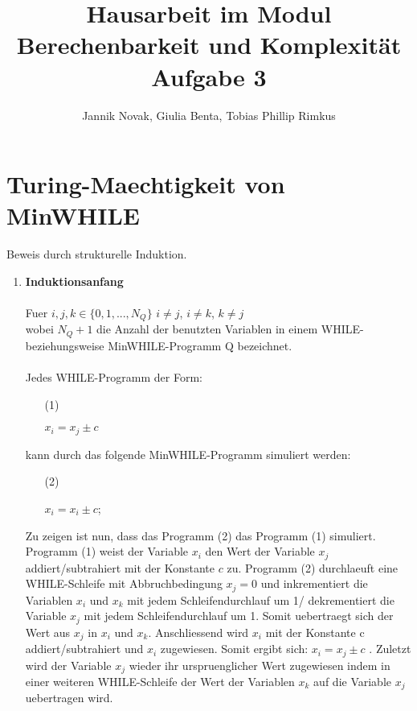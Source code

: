 \documentclass[a4paper,onecolumn,oneside,12pt,ngerman]{article}
\title{Hausarbeit im Modul \glqq Berechenbarkeit und Komplexität\grqq\\
\Large{Aufgabe 3}}
\author{Jannik Novak, Giulia Benta, Tobias Phillip Rimkus} %
\theoremstyle{plain} %
\theoremstyle{definition} %
\theoremstyle{remark} %
\theoremstyle{plain}
\begin{document}

\maketitle


\section*{Turing-Maechtigkeit von MinWHILE}
Beweis durch strukturelle Induktion.\\
\begin{enumerate}
	\item \textbf{Induktionsanfang}\\\\
		Fuer ${i,j,k}\in \{0,1,...,N_Q\}$  $i \neq j$, $i \neq k$, $k \neq j$\\wobei $N_Q + 1$ die Anzahl der benutzten Variablen in einem WHILE- beziehungsweise MinWHILE-Programm Q bezeichnet.\\\\
		Jedes WHILE-Programm der Form:\\ 
\begin{itemize}
	\item[(1)]\begin{algorithm}[H]
 	   $x_i = x_j \pm c$
	\end{algorithm}
\end{itemize}
		kann durch das folgende MinWHILE-Programm simuliert werden:\\
\begin{itemize}
	\item[(2)]\begin{algorithm}[H]
    $x_i = x_i \pm c$;\\
\end{algorithm}
\end{itemize}
		Zu zeigen ist nun, dass das Programm (2) das Programm (1)  simuliert. Programm (1) weist der Variable $x_i$ den Wert der Variable $x_j$  addiert/subtrahiert mit der Konstante $c$ zu. Programm (2) durchlaeuft eine WHILE-Schleife mit Abbruchbedingung 	$x_j = 0$ und inkrementiert die Variablen $x_i$ und $x_k$ mit jedem Schleifendurchlauf um 1/ dekrementiert die Variable $x_j$ mit jedem Schleifendurchlauf um 1. Somit uebertraegt sich der Wert aus $x_j$ in $x_i$ und $x_k$. Anschliessend wird $x_i$ mit der  Konstante c addiert/subtrahiert 	und  $x_i$ zugewiesen. Somit ergibt sich: $x_i = x_j \pm c$ . Zuletzt wird der Variable $x_j$ wieder ihr urspruenglicher Wert zugewiesen indem in einer weiteren WHILE-Schleife der Wert der Variablen $x_k$ auf die Variable $x_j$ uebertragen wird.

\end{enumerate}
\end{document}
